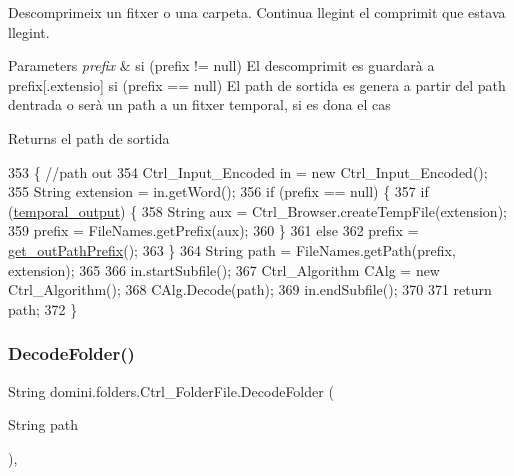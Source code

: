Descomprimeix un fitxer o una carpeta. Continua llegint el comprimit que estava llegint. 


\begin{DoxyParams}{Parameters}
{\em prefix} & si (prefix != null) El descomprimit es guardarà a prefix\mbox{[}.extensio\mbox{]} si (prefix == null) El path de sortida es genera a partir del path d\textquotesingle{}entrada o serà un path a un fitxer temporal, si es dona el cas \\
\hline
\end{DoxyParams}
\begin{DoxyReturn}{Returns}
el path de sortida 
\end{DoxyReturn}

\begin{DoxyCode}
353                                              \{ \textcolor{comment}{//path out}
354         Ctrl\_Input\_Encoded in = \textcolor{keyword}{new} Ctrl\_Input\_Encoded();
355         String extension = in.getWord();
356         \textcolor{keywordflow}{if} (prefix == null) \{
357             \textcolor{keywordflow}{if} (\hyperlink{classdomini_1_1folders_1_1Ctrl__FolderFile_a0db81590abe27b21a9b8c37633c86fa6}{temporal\_output}) \{
358                 String aux = Ctrl\_Browser.createTempFile(extension);
359                 prefix = FileNames.getPrefix(aux);
360             \}
361             \textcolor{keywordflow}{else}
362                 prefix = \hyperlink{classdomini_1_1folders_1_1Ctrl__FolderFile_a11c6b1b4a25d12b8091c7c96b3da1ea7}{get\_outPathPrefix}();
363         \}
364         String path = FileNames.getPath(prefix, extension);
365 
366         in.startSubfile();
367         Ctrl\_Algorithm CAlg = \textcolor{keyword}{new} Ctrl\_Algorithm();
368         CAlg.Decode(path);
369         in.endSubfile();
370 
371         \textcolor{keywordflow}{return} path;
372     \}
\end{DoxyCode}
\mbox{\label{classdomini_1_1folders_1_1Ctrl__FolderFile_ae8f46feaced983c27c6537794f823dd8}} 
\subsubsection{\texorpdfstring{Decode\+Folder()}{DecodeFolder()}}
{\footnotesize\ttfamily String domini.\+folders.\+Ctrl\+\_\+\+Folder\+File.\+Decode\+Folder (\begin{DoxyParamCaption}\item[{String}]{path }\end{DoxyParamCaption})\hspace{0.3cm}{\ttfamily [inline]}, {\ttfamily [private]}}



